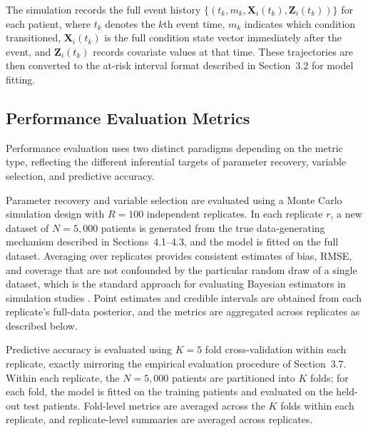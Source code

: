 \documentclass[12pt]{article}
\begin{document}
The simulation records the full event history $\{(t_k, m_k, \mathbf{X}_{i}(t_k), \mathbf{Z}_{i}(t_k))\}$ for each patient, where $t_k$ denotes the $k$th event time, $m_k$ indicates which condition transitioned, $\mathbf{X}_{i}(t_k)$ is the full condition state vector immediately after the event, and $\mathbf{Z}_{i}(t_k)$ records covariate values at that time. These trajectories are then converted to the at-risk interval format described in Section~3.2 for model fitting.

\subsection{Performance Evaluation Metrics}

Performance evaluation uses two distinct paradigms depending on the metric type, reflecting the different inferential targets of parameter recovery, variable selection, and predictive accuracy.

Parameter recovery and variable selection are evaluated using a Monte Carlo simulation design with $R = 100$ independent replicates. In each replicate $r$, a new dataset of $N = 5{,}000$ patients is generated from the true data-generating mechanism described in Sections~4.1--4.3, and the model is fitted on the full dataset. Averaging over replicates provides consistent estimates of bias, RMSE, and coverage that are not confounded by the particular random draw of a single dataset, which is the standard approach for evaluating Bayesian estimators in simulation studies \citep{morris2019bayesian}. Point estimates and credible intervals are obtained from each replicate's full-data posterior, and the metrics are aggregated across replicates as described below.

Predictive accuracy is evaluated using $K = 5$ fold cross-validation within each replicate, exactly mirroring the empirical evaluation procedure of Section~3.7. Within each replicate, the $N = 5{,}000$ patients are partitioned into $K$ folds; for each fold, the model is fitted on the training patients and evaluated on the held-out test patients. Fold-level metrics are averaged across the $K$ folds within each replicate, and replicate-level summaries are averaged across replicates. 
\end{document}
